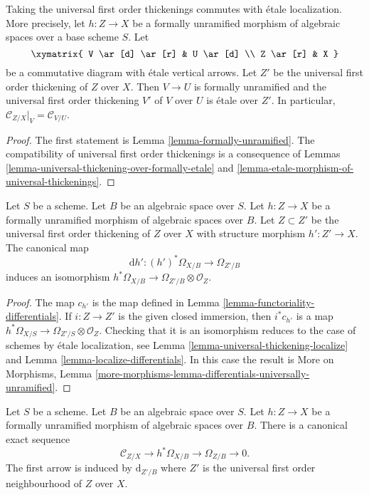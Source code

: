 \begin{lemma}
\label{lemma-universal-thickening-localize}
Taking the universal first order thickenings commutes with \'etale
localization. More precisely, let $h : Z \to X$ be a formally unramified
morphism of algebraic spaces over a base scheme $S$.
Let
$$
\xymatrix{
V \ar[d] \ar[r] & U \ar[d] \\
Z \ar[r] & X
}
$$
be a commutative diagram with \'etale vertical arrows.
Let $Z'$ be the universal first order thickening of $Z$ over $X$.
Then $V \to U$ is formally unramified and the universal first
order thickening $V'$ of $V$ over $U$ is \'etale over $Z'$.
In particular, $\mathcal{C}_{Z/X}|_V = \mathcal{C}_{V/U}$.
\end{lemma}

\begin{proof}
The first statement is
Lemma \ref{lemma-formally-unramified}.
The compatibility of universal first order thickenings is
a consequence of
Lemmas \ref{lemma-universal-thickening-over-formally-etale} and
\ref{lemma-etale-morphism-of-universal-thickenings}.
\end{proof}

\begin{lemma}
\label{lemma-differentials-universally-unramified}
Let $S$ be a scheme. Let $B$ be an algebraic space over $S$.
Let $h : Z \to X$ be a formally unramified morphism of algebraic spaces
over $B$. Let $Z \subset Z'$ be the universal first order thickening of $Z$
over $X$ with structure morphism $h' : Z' \to X$. The canonical map
$$
\text{d}h' : (h')^*\Omega_{X/B} \to \Omega_{Z'/B}
$$
induces an isomorphism
$h^*\Omega_{X/B} \to \Omega_{Z'/B} \otimes \mathcal{O}_Z$.
\end{lemma}

\begin{proof}
The map $c_{h'}$ is the map defined in
Lemma \ref{lemma-functoriality-differentials}.
If $i : Z \to Z'$ is the given closed immersion, then
$i^*c_{h'}$ is a map
$h^*\Omega_{X/S} \to \Omega_{Z'/S} \otimes \mathcal{O}_Z$.
Checking that it is an isomorphism reduces to the case of schemes
by \'etale localization, see
Lemma \ref{lemma-universal-thickening-localize}
and
Lemma \ref{lemma-localize-differentials}.
In this case the result is
More on Morphisms,
Lemma \ref{more-morphisms-lemma-differentials-universally-unramified}.
\end{proof}

\begin{lemma}
\label{lemma-universally-unramified-differentials-sequence}
Let $S$ be a scheme. Let $B$ be an algebraic space over $S$.
Let $h : Z \to X$ be a formally unramified morphism of algebraic
spaces over $B$.
There is a canonical exact sequence
$$
\mathcal{C}_{Z/X} \to h^*\Omega_{X/B} \to \Omega_{Z/B} \to 0.
$$
The first arrow is induced by $\text{d}_{Z'/B}$ where
$Z'$ is the universal first order neighbourhood of $Z$ over $X$.
\end{lemma}


